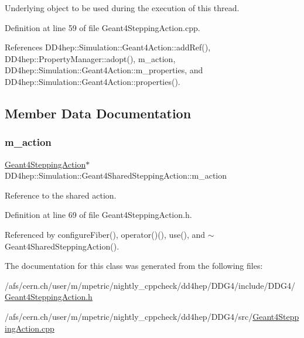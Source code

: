 Underlying object to be used during the execution of this thread. 



Definition at line 59 of file Geant4\+Stepping\+Action.\+cpp.



References D\+D4hep\+::\+Simulation\+::\+Geant4\+Action\+::add\+Ref(), D\+D4hep\+::\+Property\+Manager\+::adopt(), m\+\_\+action, D\+D4hep\+::\+Simulation\+::\+Geant4\+Action\+::m\+\_\+properties, and D\+D4hep\+::\+Simulation\+::\+Geant4\+Action\+::properties().



\subsection{Member Data Documentation}
\hypertarget{class_d_d4hep_1_1_simulation_1_1_geant4_shared_stepping_action_a193a6e462877931a4423e15174aa5a7b}{}\label{class_d_d4hep_1_1_simulation_1_1_geant4_shared_stepping_action_a193a6e462877931a4423e15174aa5a7b} 
\subsubsection{\texorpdfstring{m\+\_\+action}{m\_action}}
{\footnotesize\ttfamily \hyperlink{class_d_d4hep_1_1_simulation_1_1_geant4_stepping_action}{Geant4\+Stepping\+Action}$\ast$ D\+D4hep\+::\+Simulation\+::\+Geant4\+Shared\+Stepping\+Action\+::m\+\_\+action\hspace{0.3cm}{\ttfamily [protected]}}



Reference to the shared action. 



Definition at line 69 of file Geant4\+Stepping\+Action.\+h.



Referenced by configure\+Fiber(), operator()(), use(), and $\sim$\+Geant4\+Shared\+Stepping\+Action().



The documentation for this class was generated from the following files\+:\begin{DoxyCompactItemize}
\item 
/afs/cern.\+ch/user/m/mpetric/nightly\+\_\+cppcheck/dd4hep/\+D\+D\+G4/include/\+D\+D\+G4/\hyperlink{_geant4_stepping_action_8h}{Geant4\+Stepping\+Action.\+h}\item 
/afs/cern.\+ch/user/m/mpetric/nightly\+\_\+cppcheck/dd4hep/\+D\+D\+G4/src/\hyperlink{_geant4_stepping_action_8cpp}{Geant4\+Stepping\+Action.\+cpp}\end{DoxyCompactItemize}
